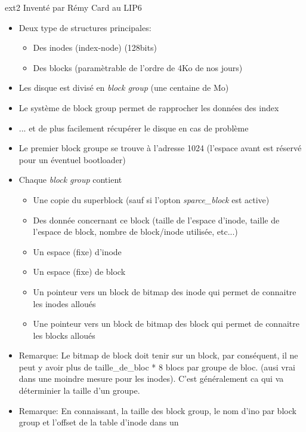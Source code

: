 \begin{frame}[fragile=singleslide]{ext2}
  Inventé par Rémy Card au LIP6
  \begin{itemize}
  \item Deux type de structures principales:
    \begin{itemize}
    \item Des inodes (index-node) (128bits)
    \item Des blocks (paramètrable de l'ordre de 4Ko de nos jours)
    \end{itemize}
  \item Les disque  est divisé en \emph{block group}  (une centaine de
    Mo)
  \item Le système de block group permet de rapprocher les données des
    index
  \item  ... et  de  plus facilement  récupérer  le disque  en cas  de
    problème
  \item Le premier  block groupe se trouve à  l'adresse 1024 (l'espace
    avant est réservé pour un éventuel bootloader)
  \item Chaque \emph{block group} contient
    \begin{itemize}
    \item    Une    copie    du    superblock   (sauf    si    l'opton
      \emph{sparce\_block} est active)
    \item Des donnée concernant  ce block (taille de l'espace d'inode,
      taille  de l'espace  de block,  nombre de  block/inode utilisée,
      etc...)
    \item Un espace (fixe) d'inode
    \item Un espace (fixe) de block
    \item Un pointeur vers un block  de bitmap des inode qui permet de
      connaitre les inodes alloués
    \item Une pointeur vers un block de bitmap des block qui permet de
      connaitre les blocks alloués
    \end{itemize}
  \item  Remarque: Le bitmap  de block  doit tenir  sur un  block, par
    conséquent, il ne  peut y avoir plus de  taille\_de\_bloc * 8 blocs
    par groupe  de bloc. (ausi vrai  dans une moindre  mesure pour les
    inodes). C'est  généralement ca qui va déterminier  la taille d'un
    groupe.
  \item Remarque:  En connaissant, la  taille des block group,  le nom
    d'ino  par block group  et l'offset  de la  table d'inode  dans un

\end{itemize}
\end{frame}
